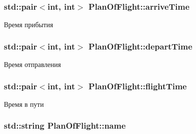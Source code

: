 \subsubsection[{\texorpdfstring{arrive\+Time}{arriveTime}}]{\setlength{\rightskip}{0pt plus 5cm}std\+::pair$<$int, int$>$ Plan\+Of\+Flight\+::arrive\+Time\hspace{0.3cm}{\ttfamily [private]}}\hypertarget{class_plan_of_flight_ae7b7991afcc8ec1e02dac388d45ef9e9}{}\label{class_plan_of_flight_ae7b7991afcc8ec1e02dac388d45ef9e9}


Время прибытия 

\subsubsection[{\texorpdfstring{depart\+Time}{departTime}}]{\setlength{\rightskip}{0pt plus 5cm}std\+::pair$<$int, int$>$ Plan\+Of\+Flight\+::depart\+Time\hspace{0.3cm}{\ttfamily [private]}}\hypertarget{class_plan_of_flight_ab852aa62bb45b7c619dc07abf424fa52}{}\label{class_plan_of_flight_ab852aa62bb45b7c619dc07abf424fa52}


Время отправления 

\subsubsection[{\texorpdfstring{flight\+Time}{flightTime}}]{\setlength{\rightskip}{0pt plus 5cm}std\+::pair$<$int, int$>$ Plan\+Of\+Flight\+::flight\+Time\hspace{0.3cm}{\ttfamily [private]}}\hypertarget{class_plan_of_flight_ac09bfe7b40243bf8b6697c075c12cf98}{}\label{class_plan_of_flight_ac09bfe7b40243bf8b6697c075c12cf98}


Время в пути 

\subsubsection[{\texorpdfstring{name}{name}}]{\setlength{\rightskip}{0pt plus 5cm}std\+::string Plan\+Of\+Flight\+::name\hspace{0.3cm}{\ttfamily [private]}}\hypertarget{class_plan_of_flight_afd9a45241cb0ae50015e31c414629206}{}\label{class_plan_of_flight_afd9a45241cb0ae50015e31c414629206}


